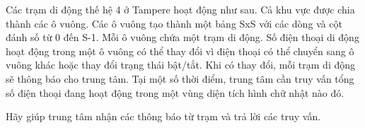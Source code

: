 Các trạm di động thế hệ 4 ở Tampere hoạt động như sau. Cả khu vực được chia thành các ô vuông. Các ô vuông tạo thành một bảng SxS với các dòng và cột đánh số từ 0 đến S-1. Mỗi ô vuông chứa một trạm di động. Số điện thoại di động hoạt động trong một ô vuông có thể thay đổi vì điện thoại có thể chuyển sang ô vuông khác hoặc thay đổi trạng thái bật/tắt. Khi có thay đổi, mỗi trạm di động sẽ thông báo cho trung tâm. Tại một số thời điểm, trung tâm cần truy vấn tổng số điện thoại đang hoạt động trong một vùng diện tích hình chữ nhật nào đó.

Hãy giúp trung tâm nhận các thông báo từ trạm và trả lời các truy vấn.
